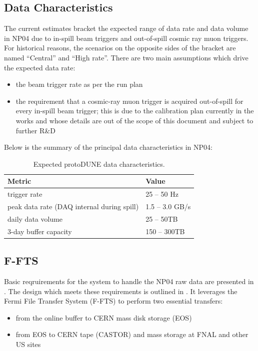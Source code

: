 \documentclass[pdftex,12pt,letter]{article}
\begin{document}
\subsection{Data Characteristics}

The current estimates \cite{docdb1086} bracket the expected range of data rate
and data volume in NP04 \cite{docdb186} due to in-spill beam triggers and out-of-spill cosmic ray muon triggers.
For historical reasons, the scenarios on the opposite sides of the bracket are named ``Central'' and ``High rate''.
There are two main assumptions which drive the expected data rate:
\begin{itemize}
\item the beam trigger rate as per the run plan
\item the requirement that a cosmic-ray muon trigger is acquired out-of-spill for every in-spill beam trigger; this is due to
the calibration plan currently in the works and whose details are out of the scope of this document and subject to
further R\&D
\end{itemize}
\noindent Below is the summary of the principal data characteristics in NP04:
\begin{table}[tbh]
\centering
\begin{tabular}{l l}
\hline
\textbf{Metric} & \textbf{Value} \\
\hline
\hline
trigger rate				& 25 -- 50 Hz \\  \hline
peak data rate (DAQ internal during spill)	& 1.5 -- 3.0 GB/s \\ \hline
daily data volume &  25 -- 50TB \\ \hline
3-day buffer capacity & 150 -- 300TB \\  \hline
\hline
\end{tabular}
\caption{\label{tab:data_char}Expected protoDUNE data characteristics.}
\end{table}

\subsection{F-FTS}
Basic reqruirements for the system to handle the NP04 raw data are presented in \cite{docdb1209}.
The design which meets these requirements is outlined in \cite{docdb1212}. It leverages the
Fermi File Transfer System (F-FTS) to perform two essential transfers:
\begin{itemize}
\item from the online buffer to CERN mass disk storage (EOS)
\item from EOS to CERN tape (CASTOR) and  mass storage at FNAL and other US sites
\end{itemize}
\end{document}

